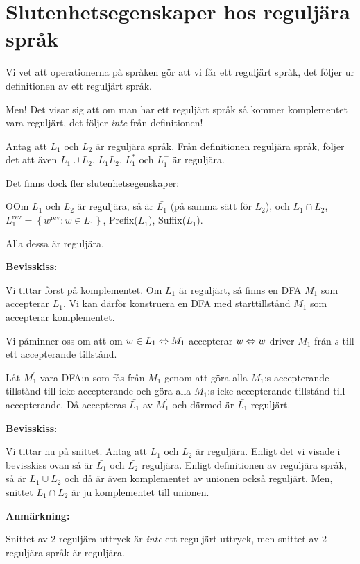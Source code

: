 \section{Slutenhetsegenskaper hos reguljära språk}\par
\noindent Vi vet att operationerna på språken gör att vi får ett reguljärt språk, det följer ur definitionen av ett reguljärt språk.\par
\noindent Men! Det visar sig att om man har ett reguljärt språk så kommer komplementet vara reguljärt, det följer \textit{inte} från definitionen!
\par\bigskip
\noindent Antag att $L_1$ och $L_2$ är reguljära språk. Från definitionen reguljära språk, följer det att även $L_1\cup L_2$, $L_1L_2$, $L_1^*$ och $L_1^+$ är reguljära.\par
\noindent Det finns dock fler slutenhetsegenskaper:
\par\bigskip
\begin{theo}
  OOm $L_1$ och $L_2$ är reguljära, så är $\bar{L_1}$ (på samma sätt för $L_2$), och $L_1\cap L_2$, $L_1^{\text{rev}} = \left\{w^{\text{rev}}: w\in L_1\right\}$, Prefix($L_1$), Suffix($L_1$).\par
  \noindent Alla dessa är reguljära.
\end{theo}
\par\bigskip
\noindent\textbf{Bevisskiss}:\par
\noindent Vi tittar först på komplementet. Om $L_1$ är reguljärt, så finns en DFA $M_1$ som accepterar $L_1$. Vi kan därför konstruera en DFA med starttillstånd $M_1$ som accepterar komplementet.\par
\noindent Vi påminner oss om att om $w\in L_1\Leftrightarrow M_1$ accepterar $w\Leftrightarrow w$ driver $M_1$ från $s$ till ett accepterande tillstånd.\par
\noindent Låt $M_1^{\prime}$ vara DFA:n som fås från $M_1$ genom att göra alla $M_1$:s accepterande tillstånd till icke-accepterande och göra alla $M_1$:s icke-accepterande tillstånd till accepterande. Då accepteras $\bar{L_1}$ av $M_1^{\prime}$ och därmed är $\bar{L_1}$ reguljärt.
\par\bigskip
\noindent\textbf{Bevisskiss}:\par
\noindent Vi tittar nu på snittet. Antag att $L_1$ och $L_2$ är reguljära. Enligt det vi visade i bevisskiss ovan så är $\bar{L_1}$ och $\bar{L_2}$ reguljära. Enligt definitionen av reguljära språk, så är $\bar{L_1}\cup\bar{L_2}$ och då är även komplementet av unionen också reguljärt. Men, snittet $L_1\cap L_2$ är ju komplementet till unionen.
\par\bigskip
\noindent\textbf{Anmärkning:}\par
\noindent Snittet av 2 reguljära uttryck är \textit{inte} ett reguljärt uttryck, men snittet av 2 reguljära språk är reguljära.
\par\bigskip
